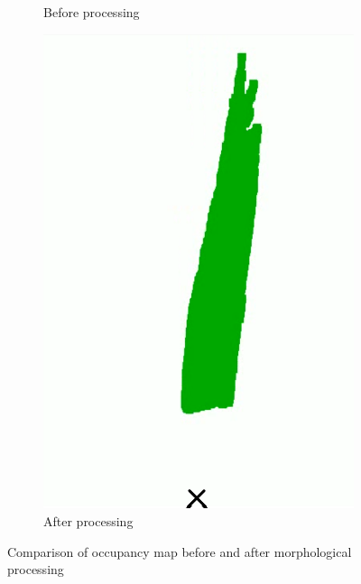 \begin{figure}[b]
\begin{subfigure}{.3\textwidth}
        \caption{Before processing}
    \end{subfigure}
    \quad
    \begin{subfigure}{.3\textwidth}
        \centering
        \includegraphics[width=\linewidth]{images/occupancy_map1.png}
        \caption{After processing}
    \end{subfigure}
    \caption{Comparison of occupancy map before and after morphological processing}
    \label{fig:morphological_processing}
\end{figure}

